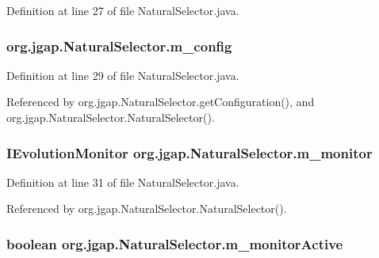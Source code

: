 Definition at line 27 of file Natural\-Selector.\-java.

\hypertarget{classorg_1_1jgap_1_1_natural_selector_ac8b1ddd06acc72b0e1d8e551729f46b3}{
\subsubsection[{m\-\_\-config}]{ org.\-jgap.\-Natural\-Selector.\-m\-\_\-config\hspace{0.3cm}{\ttfamily [protected]}}}\label{classorg_1_1jgap_1_1_natural_selector_ac8b1ddd06acc72b0e1d8e551729f46b3}


Definition at line 29 of file Natural\-Selector.\-java.



Referenced by org.\-jgap.\-Natural\-Selector.\-get\-Configuration(), and org.\-jgap.\-Natural\-Selector.\-Natural\-Selector().

\hypertarget{classorg_1_1jgap_1_1_natural_selector_a0ecc4abad2b9f2235e686113913dec17}{
\subsubsection[{m\-\_\-monitor}]{\setlength{\rightskip}{0pt plus 5cm}I\-Evolution\-Monitor org.\-jgap.\-Natural\-Selector.\-m\-\_\-monitor\hspace{0.3cm}{\ttfamily [protected]}}}\label{classorg_1_1jgap_1_1_natural_selector_a0ecc4abad2b9f2235e686113913dec17}


Definition at line 31 of file Natural\-Selector.\-java.



Referenced by org.\-jgap.\-Natural\-Selector.\-Natural\-Selector().

\hypertarget{classorg_1_1jgap_1_1_natural_selector_a97b709b2715d76b87b3e15da6a22d5f8}{
\subsubsection[{m\-\_\-monitor\-Active}]{\setlength{\rightskip}{0pt plus 5cm}boolean org.\-jgap.\-Natural\-Selector.\-m\-\_\-monitor\-Active\hspace{0.3cm}{\ttfamily [protected]}}}\label{classorg_1_1jgap_1_1_natural_selector_a97b709b2715d76b87b3e15da6a22d5f8}


